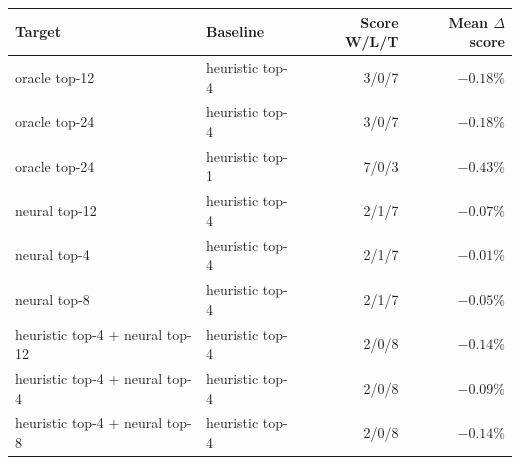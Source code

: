 \begin{tabular}{llrr}
\toprule
Target & Baseline & Score W/L/T & Mean $\Delta$ score \\
\midrule
oracle top-12 & heuristic top-4 & 3/0/7 & $-0.18\%$ \\
oracle top-24 & heuristic top-4 & 3/0/7 & $-0.18\%$ \\
oracle top-24 & heuristic top-1 & 7/0/3 & $-0.43\%$ \\
neural top-12 & heuristic top-4 & 2/1/7 & $-0.07\%$ \\
neural top-4 & heuristic top-4 & 2/1/7 & $-0.01\%$ \\
neural top-8 & heuristic top-4 & 2/1/7 & $-0.05\%$ \\
heuristic top-4 + neural top-12 & heuristic top-4 & 2/0/8 & $-0.14\%$ \\
heuristic top-4 + neural top-4 & heuristic top-4 & 2/0/8 & $-0.09\%$ \\
heuristic top-4 + neural top-8 & heuristic top-4 & 2/0/8 & $-0.14\%$ \\
\bottomrule
\end{tabular}
